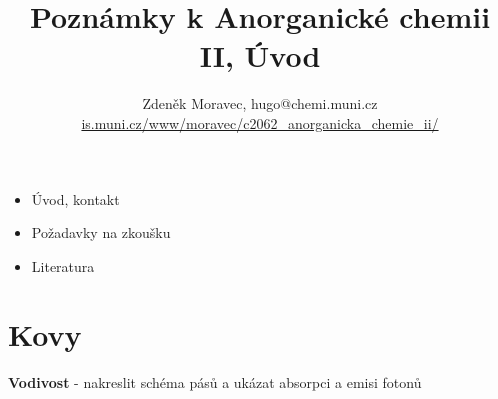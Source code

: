 \documentclass[17pt,a4paper,twoside]{extarticle}
\begin{document}
\title{Poznámky k Anorganické chemii II, Úvod}
\author{Zdeněk Moravec, hugo@chemi.muni.cz \\
		\href{https://is.muni.cz/www/moravec/c2062_anorganicka_chemie_ii/}{is.muni.cz/www/moravec/c2062\_anorganicka\_chemie\_ii/}}

\maketitle

\tableofcontents
\clearpage

\begin{itemize}
	\item Úvod, kontakt
	\item Požadavky na zkoušku
	\item Literatura
\end{itemize}

\section{Kovy}

\textbf{Vodivost} - nakreslit schéma pásů a ukázat absorpci a emisi fotonů
\end{document}
